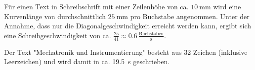 \documentclass[a4paper,twoside,12pt,DIV=13,BCOR=5mm,numbers=noenddot,cleardoublepage=empty]{scrbook}
\begin{document}
Für einen Text in Schreibschrift mit einer Zeilenhöhe von ca. $\qty{10}{\milli\meter}$ wird eine Kurvenlänge von durchschnittlich $\qty{25}{\mm}$ pro Buchstabe angenommen.
Unter der Annahme, dass nur die Diagonalgeschwindigkeit erreicht werden kann, ergibt sich eine Schreibgeschwindigkeit von ca. $\frac{25}{41}\approx 0.6 \,\frac{\text{Buchstaben}}{\text{s}}$.

Der Text "Mechatronik und Instrumentierung" besteht aus 32 Zeichen (inklusive Leerzeichen) und wird damit in ca. \qty{19.5}{\s} geschrieben.


% 
% 
\end{document}
